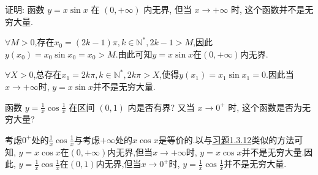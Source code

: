 \begin{exercise}[1.3.12]\label{exe:1.3.12}
    证明: 函数 $y=x\sin x$ 在 $(0, +\infty)$ 内无界, 但当 $x \to +\infty$ 时, 这个函数并不是无穷大量.
\end{exercise}

\begin{solution}
    $\forall M > 0$,存在$x_0 = (2k-1) \pi, k \in \mathbb{N}^*, 2k - 1 > M$,因此$y(x_0) = x_0 \sin x_0 = x_0 > M$.由此可知$y = x \sin x$在$(0, +\infty)$内无界.

    $\forall X > 0$,总存在$x_1 = 2k \pi, k \in \mathbb{N}^*, 2k \pi > X$,使得$y(x_1) = x_1 \sin x_1 = 0$.因此当$x \to +\infty$时, $y = x \sin x$并不是无穷大量.
\end{solution}

\begin{exercise}[1.3.13]
    函数 $y = \frac{1}{x}\cos\frac{1}{x}$ 在区间 $(0,1)$ 内是否有界? 又当 $x \to 0^+$ 时, 这个函数是否为无穷大量?
\end{exercise}

\begin{solution}
    考虑$0^+$处的$\frac{1}{x} \cos \frac{1}{x}$与考虑$+\infty$处的$x \cos x$是等价的.以与\hyperref[exe:1.3.12]{习题1.3.12}类似的方法可知, $y = x \cos x$在$(0, +\infty)$内无界,但当$x \to +\infty$时, $y = x \cos x$并不是无穷大量.因此, $y = \frac{1}{x} \cos \frac{1}{x}$在$(0, 1)$内无界,但当$x \to 0^+$时, $y = \frac{1}{x} \cos \frac{1}{x}$并不是无穷大量.
\end{solution}

